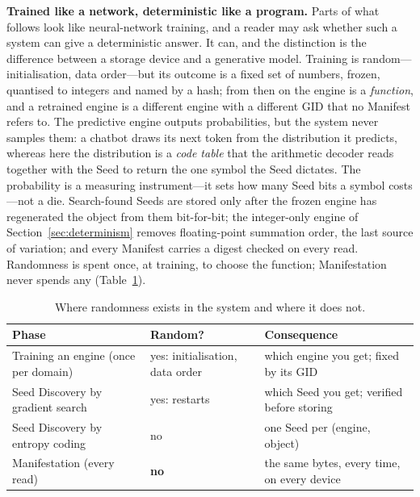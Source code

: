 \documentclass[11pt,a4paper]{article}
\theoremstyle{definition}
\theoremstyle{plain}
\theoremstyle{remark}
\begin{document}
\textbf{Trained like a network, deterministic like a program.} Parts of what follows look like
neural-network training, and a reader may ask whether such a system can give a deterministic
answer. It can, and the distinction is the difference between a storage device and a generative
model. Training is random---initialisation, data order---but its outcome is a fixed set of
numbers, frozen, quantised to integers and named by a hash; from then on the engine is a
\emph{function}, and a retrained engine is a different engine with a different GID that no
Manifest refers to. The predictive engine outputs probabilities, but the system never samples
them: a chatbot draws its next token from the distribution it predicts, whereas here the
distribution is a \emph{code table} that the arithmetic decoder reads together with the Seed to
return the one symbol the Seed dictates. The probability is a measuring instrument---it sets how
many Seed bits a symbol costs---not a die. Search-found Seeds are stored only after the frozen
engine has regenerated the object from them bit-for-bit; the integer-only engine of
Section~\ref{sec:determinism} removes floating-point summation order, the last source of
variation; and every Manifest carries a digest checked on every read. Randomness is spent once,
at training, to choose the function; Manifestation never spends any (Table~\ref{tab:rand}).

\begin{table}[!htb]
\centering\small
\caption{Where randomness exists in the system and where it does not.}
\label{tab:rand}
\begin{tabular}{@{}p{5.4cm}p{3.6cm}p{5.6cm}@{}}
\toprule
\textbf{Phase} & \textbf{Random?} & \textbf{Consequence} \\
\midrule
Training an engine (once per domain) & yes: initialisation, data order & which engine you get; fixed by its GID \\
Seed Discovery by gradient search & yes: restarts & which Seed you get; verified before storing \\
Seed Discovery by entropy coding & no & one Seed per (engine, object) \\
Manifestation (every read) & \textbf{no} & the same bytes, every time, on every device \\
\bottomrule
\end{tabular}
\end{table}

\end{document}
